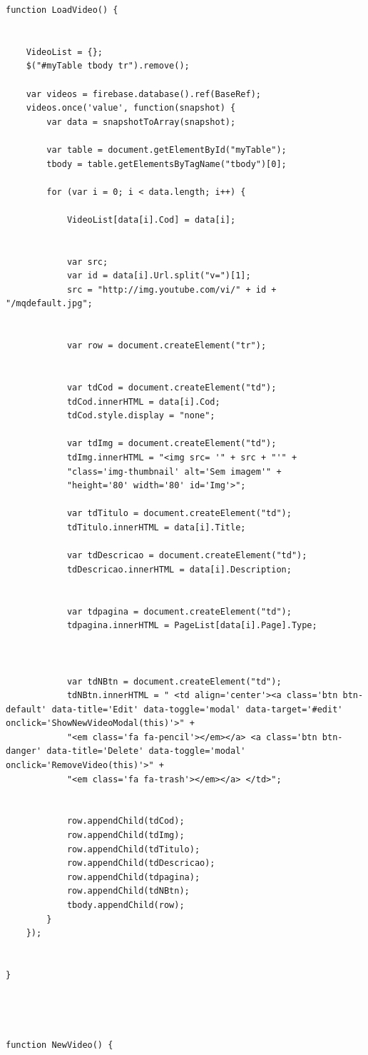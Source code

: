 \documentclass[
	12pt,				%
	openright,			%
	twoside,			%
	a4paper,			%
	english,			%
	french,				%
	spanish,			%
	brazil				%
	]{abntex2}
\begin{document}
\begin{apendicesenv}
\begin{lstlisting}[numbers=none,
basicstyle=\small,
caption={Video.js},
title={Video.js},
label={Video.js}]
function LoadVideo() {
	
	
	VideoList = {};
	$("#myTable tbody tr").remove();
	
	var videos = firebase.database().ref(BaseRef);
	videos.once('value', function(snapshot) {
		var data = snapshotToArray(snapshot);
		
		var table = document.getElementById("myTable");
		tbody = table.getElementsByTagName("tbody")[0];
		
		for (var i = 0; i < data.length; i++) {
			
			VideoList[data[i].Cod] = data[i];
			
			
			var src;
			var id = data[i].Url.split("v=")[1];
			src = "http://img.youtube.com/vi/" + id + "/mqdefault.jpg";
			
			
			var row = document.createElement("tr");
			
			
			var tdCod = document.createElement("td");
			tdCod.innerHTML = data[i].Cod;
			tdCod.style.display = "none";
			
			var tdImg = document.createElement("td");
			tdImg.innerHTML = "<img src= '" + src + "'" +
			"class='img-thumbnail' alt='Sem imagem'" +
			"height='80' width='80' id='Img'>";
			
			var tdTitulo = document.createElement("td");
			tdTitulo.innerHTML = data[i].Title;
			
			var tdDescricao = document.createElement("td");
			tdDescricao.innerHTML = data[i].Description;
			
			
			var tdpagina = document.createElement("td");
			tdpagina.innerHTML = PageList[data[i].Page].Type;
			
			
			
			var tdNBtn = document.createElement("td");
			tdNBtn.innerHTML = " <td align='center'><a class='btn btn-default' data-title='Edit' data-toggle='modal' data-target='#edit' onclick='ShowNewVideoModal(this)'>" +
			"<em class='fa fa-pencil'></em></a> <a class='btn btn-danger' data-title='Delete' data-toggle='modal' onclick='RemoveVideo(this)'>" +
			"<em class='fa fa-trash'></em></a> </td>";
			
			
			row.appendChild(tdCod);
			row.appendChild(tdImg);
			row.appendChild(tdTitulo);
			row.appendChild(tdDescricao);
			row.appendChild(tdpagina);
			row.appendChild(tdNBtn);
			tbody.appendChild(row);
		}
	});
	
	
}




function NewVideo() {
	

\end{lstlisting}
\end{apendicesenv}
\end{document}
